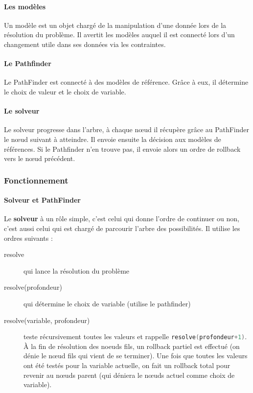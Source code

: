 \paragraph{Les modèles}

Un modèle est un objet chargé de la manipulation d'une donnée lors de la résolution du problème. Il avertit les modèles auquel il est connecté lors d'un changement utile dans ses données via les contraintes.

\paragraph{Le Pathfinder}

Le PathFinder est connecté à des modèles de référence. Grâce à eux, il détermine le choix de valeur et le choix de variable.

\paragraph{Le solveur}

Le solveur progresse dans l'arbre, à chaque n\oe ud il récupère grâce au PathFinder le n\oe ud suivant à atteindre. Il envoie ensuite la décision aux modèles de références. Si le Pathfinder n'en trouve pas, il envoie alors un ordre de rollback vers le n\oe ud précédent.
\newpage

\subsubsection{Fonctionnement}

\paragraph{Solveur et PathFinder}

Le \textbf{solveur} à un rôle simple, c'est celui qui donne l'ordre de continuer ou non, c'est aussi celui qui est chargé de parcourir l'arbre des possibilités.
Il utilise les ordres suivants :

\begin{description}
	\item [resolve] qui lance la résolution du problème
	\item [resolve(profondeur)] qui détermine le choix de variable (utilise le pathfinder)
	\item [resolve(variable, profondeur)] teste récursivement toutes les valeurs et rappelle \lstinline[language=c++]|resolve(profondeur+1)|. \`{A} la fin de résolution des noeuds fils, un rollback partiel est effectué (on dénie le n\oe ud fils qui vient de se terminer).
	Une fois que toutes les valeurs ont été testés pour la variable actuelle, on fait un rollback total pour revenir au n\oe uds parent (qui déniera le n\oe uds actuel comme choix de variable).
\end{description}

